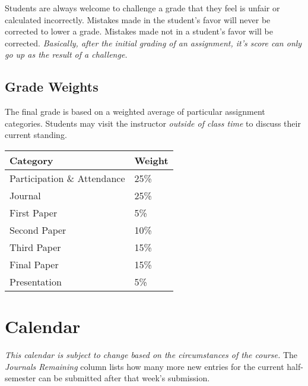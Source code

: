 \documentclass[]{tufte-handout}
\begin{document}
Students are always welcome to challenge a grade that they feel is unfair or calculated incorrectly.  Mistakes made in the student's favor will never be corrected to lower a grade.  Mistakes made not in a student's favor will be corrected.  \textit{Basically, after the initial grading of an assignment, it's score can only go up as the result of a challenge.}


\subsection{Grade Weights}

The final grade is based on a weighted average of particular assignment categories.  Students may visit the instructor \textit{outside of class time} to discuss their current standing.  

\begin{center}
\begin{tabular}{ll}
Category & Weight  \\ \hline
Participation \& Attendance & 25\% \\
Journal & 25\% \\
First Paper & 5\% \\
Second Paper & 10\% \\
Third Paper & 15\% \\
Final Paper & 15\% \\
Presentation & 5\% \\
\end{tabular}
\end{center}


\section{Calendar}

\textit{This calendar is subject to change based on the circumstances of the course.}  The \textit{Journals Remaining} column lists how many more new entries for the current half-semester can be submitted after that week's submission.
\end{document}
